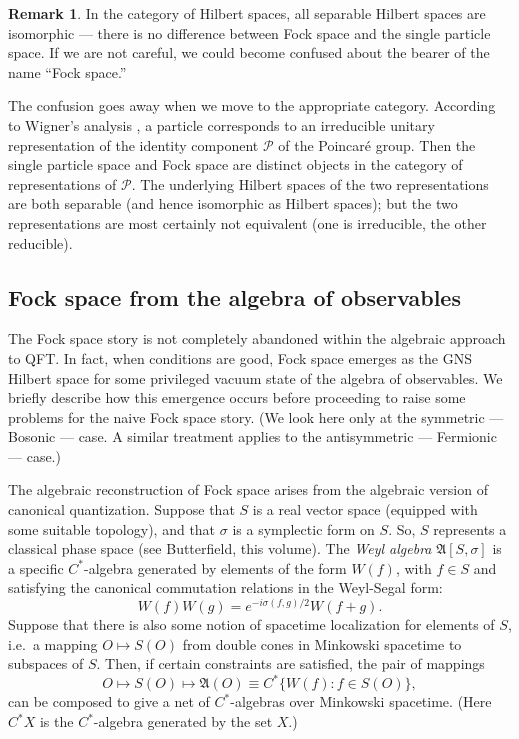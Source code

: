 \documentclass[12pt]{article}
\newcommand{\alg}[1]{\mathfrak{#1}}
\theoremstyle{definition}
\theoremstyle{definition}
\newtheorem{note}[thm]{Remark}
\theoremstyle{remark}
\def\2#1{{\mathcal #1}}
\begin{document}
\begin{note} In the category of Hilbert spaces, all separable Hilbert
  spaces are isomorphic --- there is no difference between Fock space
  and the single particle space.  If we are not careful, we could
  become confused about the bearer of the name ``Fock space.''

  The confusion goes away when we move to the appropriate category.
  According to Wigner's analysis \cite{wig}, a particle corresponds to
  an irreducible unitary representation of the identity component
  $\2P$ of the Poincar{\'e} group.  Then the single particle space and
  Fock space are distinct objects in the category of representations
  of $\2P$.  The underlying Hilbert spaces of the two representations
  are both separable (and hence isomorphic as Hilbert spaces); but the
  two representations are most certainly not equivalent (one is
  irreducible, the other reducible).
\end{note}



\subsection{Fock space from the algebra of observables}

The Fock space story is not completely abandoned within the algebraic
approach to QFT.  In fact, when conditions are good, Fock space
emerges as the GNS Hilbert space for some privileged vacuum state of
the algebra of observables.  We briefly describe how this emergence
occurs before proceeding to raise some problems for the naive Fock
space story.  (We look here only at the symmetric --- Bosonic ---
case.  A similar treatment applies to the antisymmetric --- Fermionic
--- case.)

The algebraic reconstruction of Fock space arises from
the algebraic version of canonical quantization.
Suppose that $S$ is a real vector space (equipped with
some suitable topology), and that $\sigma$ is a
symplectic form on $S$.  So, $S$ represents a classical
phase space (see Butterfield, this volume).  The
\emph{Weyl algebra} $\alg{A}[S,\sigma ]$ is a specific
$C^*$-algebra generated by elements of the form $W(f)$,
with $f\in S$ and satisfying the canonical commutation
relations in the Weyl-Segal form:
$$ W(f)W(g)=e^{-i\sigma (f,g)/2}W(f+g) .$$ 
Suppose that there is also some notion of spacetime localization for
elements of $S$, i.e.\ a mapping $O\mapsto S(O)$ from double cones in
Minkowski spacetime to subspaces of $S$.  Then, if certain constraints
are satisfied, the pair of mappings
$$ O\mapsto S(O)\mapsto \alg{A}(O)\equiv C^*\{ W(f):f\in S(O) \} ,$$ 
can be composed to give a net of $C^*$-algebras over Minkowski
spacetime. (Here $C^*X$ is the $C^*$-algebra generated by the set
$X$.)
\end{document}
